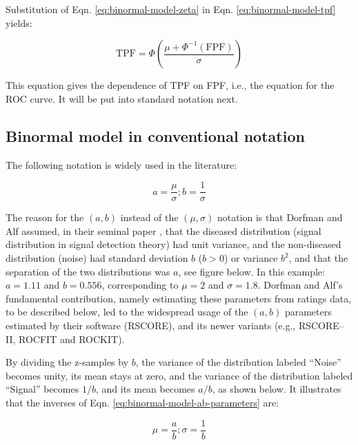 \documentclass[
]{book}
\begin{document}
Substitution of Eqn. \eqref{eq:binormal-model-zeta} in Eqn. \eqref{eq:binormal-model-tpf} yields:

\begin{equation} 
\text{TPF} = \Phi\left ( \frac{\mu + \Phi^{-1}\left (\text{FPF}  \right )}{\sigma} \right )
\label{eq:binormal-model-roc-curve1}
\end{equation}

This equation gives the dependence of TPF on FPF, i.e., the equation for the ROC curve. It will be put into standard notation next.

\hypertarget{binormal-model-in-conventional-notation}{%
\subsection{Binormal model in conventional notation}\label{binormal-model-in-conventional-notation}}

The following notation is widely used in the literature:

\begin{equation} 
a=\frac{\mu}{\sigma};b=\frac{1}{\sigma}
\label{eq:binormal-model-ab-parameters}
\end{equation}

The reason for the \((a,b)\) instead of the \((\mu,\sigma)\) notation is that Dorfman and Alf assumed, in their seminal paper \citep{RN1081}, that the diseased distribution (signal distribution in signal detection theory) had unit variance, and the non-diseased distribution (noise) had standard deviation \(b\) (\(b > 0\)) or variance \(b^2\), and that the separation of the two distributions was \(a\), see figure below. In this example: \(a = 1.11\) and \(b = 0.556\), corresponding to \(\mu = 2\) and \(\sigma = 1.8\). Dorfman and Alf's fundamental contribution, namely estimating these parameters from ratings data, to be described below, led to the widespread usage of the \((a,b)\) parameters estimated by their software (RSCORE), and its newer variants (e.g., RSCORE--II, ROCFIT and ROCKIT).

By dividing the z-samples by \(b\), the variance of the distribution labeled ``Noise'' becomes unity, its mean stays at zero, and the variance of the distribution labeled ``Signal'' becomes \(1/b\), and its mean becomes \(a/b\), as shown below. It illustrates that the inverses of Eqn. \eqref{eq:binormal-model-ab-parameters} are:

\begin{equation} 
\mu=\frac{a}{b};\sigma=\frac{1}{b}
\label{eq:binormal-model-ab-parametersInv}
\end{equation}
\end{document}
